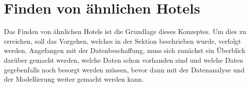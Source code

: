 \section{Finden von ähnlichen Hotels}
\label{sec:find_similar}
Das Finden von ähnlichen Hotels ist die Grundlage dieses Konzeptes. Um dies zu erreichen, soll das Vorgehen, welches in der Sektion \emph{} beschrieben wurde, verfolgt werden. Angefangen mit der Datenbeschaffung, muss sich zunächst ein Überblick darüber gemacht werden, welche Daten schon vorhanden sind und welche Daten gegebenfalls noch besorgt werden müssen, bevor dann mit der Datenanalyse und der Modellierung weiter gemacht werden kann. 







